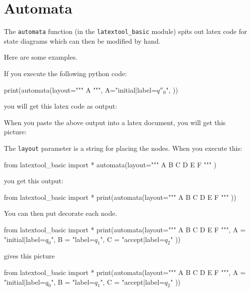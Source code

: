 \section{Automata}

The \verb!automata! function (in the \verb!latextool_basic! module)
spits out latex code for
state diagrams which can then be modified by hand.

Here are some examples.

If you execute the following python code:
\begin{console}
print(automata(layout="""
    A
    """,
    A="initial|label=$q''_0$",
    ))
\end{console}
you will get this latex code as output:
\begin{console}
\begin{center}
\end{center}
\end{console}
When you paste the above output into a 
latex document, you will get this picture:
\begin{center}
\end{center}




The \verb!layout! parameter is a string for placing the nodes.
When you execute this:
\begin{console}
from latextool_basic import *
automata(layout="""
A B   C
D
E   F
"""
)
\end{console}
you get this output:
\begin{python}
from latextool_basic import *
print(automata(layout="""
A B   C
D
E   F
"""
))
\end{python}
You can then put decorate each node.
\begin{console}
from latextool_basic import *
print(automata(layout="""
A B   C
D
E   F
""",
A = "initial|label=$q_0$",
B = "label=$q_1$",
C = "accept|label=$q_2$"
))
\end{console}
gives this picture
\begin{python}
from latextool_basic import *
print(automata(layout="""
A B   C
D
E   F
""",
A = "initial|label=$q_0$",
B = "label=$q_1$",
C = "accept|label=$q_2$"
))
\end{python}








